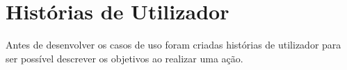 \section{Histórias de Utilizador}
Antes de desenvolver os casos de uso foram criadas histórias de utilizador para ser possível descrever os objetivos ao realizar uma ação.

